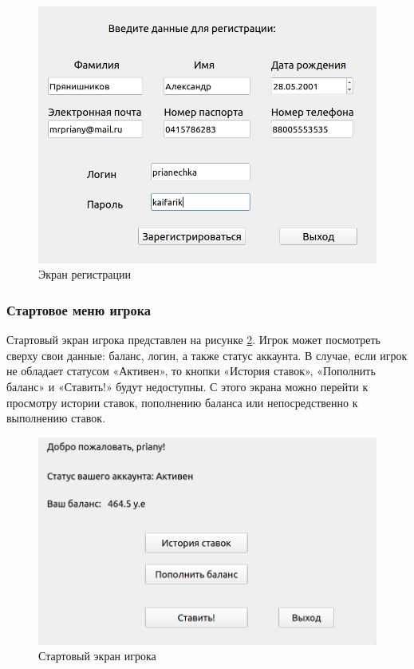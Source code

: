\FloatBarrier
\begin{figure}[hp]	
	\begin{center}
		\includegraphics[width=\linewidth]{inc/registrate.png}
	\end{center}
	\captionsetup{justification=centering, labelsep=defffis}
	\caption{Экран регистрации}
	\label{fig::reg}
\end{figure}
\FloatBarrier

\newpage
\subsubsection{Стартовое меню игрока}
Стартовый экран игрока представлен на рисунке \ref{fig::user}. 
Игрок может посмотреть сверху свои данные: баланс, логин, а также статус аккаунта.
В случае, если игрок не обладает статусом «Активен», то кнопки «История ставок», «Пополнить баланс» и «Ставить!» будут недоступны.
С этого экрана можно перейти к просмотру истории ставок, пополнению баланса или непосредственно к выполнению ставок.

\FloatBarrier
\begin{figure}[h]	
	\begin{center}
		\includegraphics[width=\linewidth]{inc/user.png}
	\end{center}
	\captionsetup{justification=centering, labelsep=defffis}
	\caption{Стартовый экран игрока}
	\label{fig::user}
\end{figure}
\FloatBarrier

